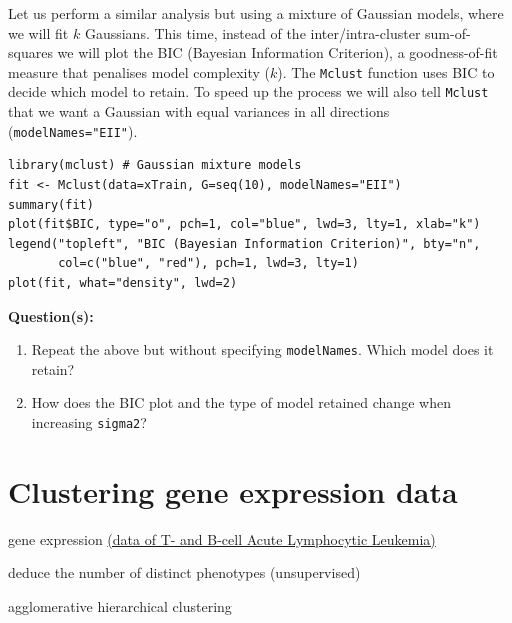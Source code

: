 \documentclass[a4paper,11pt]{article}
\begin{document}
Let us perform a similar analysis but using a mixture of Gaussian models, where
we will fit $k$ Gaussians. This time, instead of the inter/intra-cluster sum-of-squares
we will plot the BIC (Bayesian Information Criterion), a goodness-of-fit measure that
penalises model complexity ($k$). The \texttt{Mclust} function uses BIC to decide which
model to retain. To speed up the process we will also tell \texttt{Mclust} that we
want a Gaussian with equal variances in all directions (\texttt{modelNames="EII"}). 
\\
\begin{lstlisting}[style=RCode]
library(mclust) # Gaussian mixture models
fit <- Mclust(data=xTrain, G=seq(10), modelNames="EII")
summary(fit)
plot(fit$BIC, type="o", pch=1, col="blue", lwd=3, lty=1, xlab="k")
legend("topleft", "BIC (Bayesian Information Criterion)", bty="n",
       col=c("blue", "red"), pch=1, lwd=3, lty=1)
plot(fit, what="density", lwd=2)
\end{lstlisting}

\begin{framed}
\textbf{Question(s):}
\begin{enumerate}
	\item Repeat the above but without specifying \texttt{modelNames}. Which model does it retain?
	\item How does the BIC plot and the type of model retained change when increasing \texttt{sigma2}?
\end{enumerate}
\end{framed}

\clearpage
\section{Clustering gene expression data}
\begin{framed}
\begin{description}[leftmargin=5em,style=nextline]\addtolength{\itemsep}{-0.2\baselineskip}
	\item[Data:] gene expression \href{http://www.bioconductor.org/packages/release/data/experiment/html/ALL.html}{(data of T- and B-cell Acute Lymphocytic Leukemia)}	
	\item[Task:] deduce the number of distinct phenotypes (unsupervised)
	\item[Method:] agglomerative hierarchical clustering
\end{description} 
\end{framed}
\end{document}
